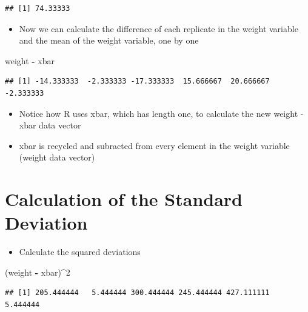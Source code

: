 \documentclass[
]{book}
\newenvironment{Shaded}{\begin{snugshade}}{\end{snugshade}}
\newcommand{\DecValTok}[1]{\textcolor[rgb]{0.00,0.00,0.81}{#1}}
\newcommand{\NormalTok}[1]{#1}
\newcommand{\SpecialCharTok}[1]{\textcolor[rgb]{0.81,0.36,0.00}{\textbf{#1}}}
\providecommand{\tightlist}{%
  \setlength{\itemsep}{0pt}\setlength{\parskip}{0pt}}
\begin{document}
\begin{verbatim}
## [1] 74.33333
\end{verbatim}

\begin{itemize}
\tightlist
\item
  Now we can calculate the difference of each replicate in the weight variable and the mean of the weight variable, one by one
\end{itemize}

\begin{Shaded}
\begin{Highlighting}[]
\NormalTok{weight }\SpecialCharTok{{-}}\NormalTok{ xbar}
\end{Highlighting}
\end{Shaded}

\begin{verbatim}
## [1] -14.333333  -2.333333 -17.333333  15.666667  20.666667  -2.333333
\end{verbatim}

\begin{itemize}
\item
  Notice how R uses xbar, which has length one, to calculate the new weight - xbar data vector
\item
  xbar is recycled and subracted from every element in the weight variable (weight data vector)
\end{itemize}

\section{Calculation of the Standard Deviation}\label{calculation-of-the-standard-deviation}

\begin{itemize}
\tightlist
\item
  Calculate the squared deviations
\end{itemize}

\begin{Shaded}
\begin{Highlighting}[]
\NormalTok{(weight }\SpecialCharTok{{-}}\NormalTok{ xbar)}\SpecialCharTok{\^{}}\DecValTok{2}
\end{Highlighting}
\end{Shaded}

\begin{verbatim}
## [1] 205.444444   5.444444 300.444444 245.444444 427.111111   5.444444
\end{verbatim}
\end{document}
